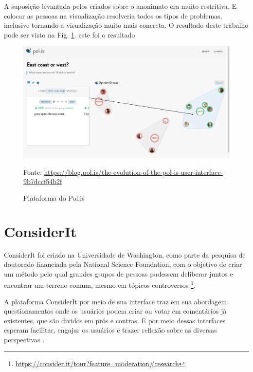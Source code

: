 
A suposição levantada pelos criados sobre o anonimato era muito restritiva. E colocar as pessoas na visualização resolveria todos os tipos de problemas, inclusive tornando a visualização muito mais concreta. O resultado deste trabalho pode ser visto na Fig. \ref{fig03}. este foi o resultado 


\begin{figure}[h]
	\centering
	\includegraphics[keepaspectratio=true,scale=0.3]{figuras/evolucao-polis-3.png}
	\caption{Plataforma do Pol.is}
	Fonte: \url{https://blog.pol.is/the-evolution-of-the-pol-is-user-interface-9b7dccf54b2f}
	\label{fig03}
\end{figure}



\section{ConsiderIt}

ConsiderIt foi criado na Universidade de Washington, como parte da pesquisa de doutorado financiada pela National Science Foundation, com o objetivo de criar um método pelo qual grandes grupos de pessoas pudessem deliberar juntos e encontrar um terreno comum, mesmo em tópicos controversos 
\footnote{\href{https://consider.it/tour?feature=moderation\#research}{https://consider.it/tour?feature=moderation\#research}}.

A plataforma ConsiderIt por meio de sua interface traz em sua abordagem questionamentos onde os usuários podem criar ou votar em comentários já existentes, que são dividos em prós e contras. E por meio dessas interfaces esperam facilitar, engajar os usuários e trazer reflexão sobre as diversas perspectivas \cite{bennett2012}.


